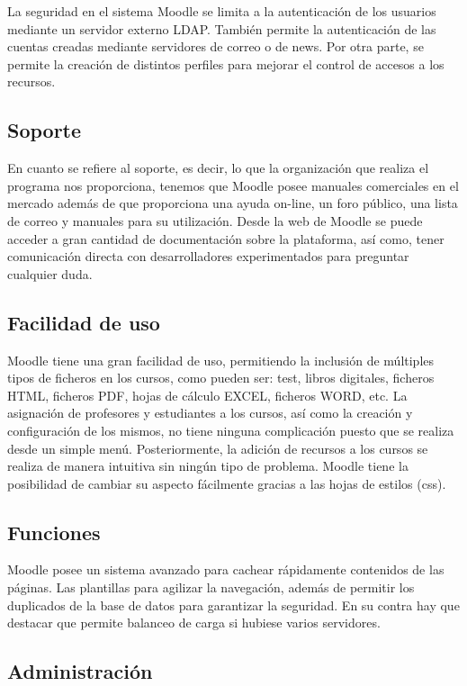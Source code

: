 La seguridad en el sistema Moodle se limita a la autenticación de los usuarios mediante un servidor externo LDAP. También permite la autenticación de las cuentas creadas mediante servidores de correo o de news. Por otra parte, se permite la creación de distintos perfiles para mejorar el control de accesos a los recursos.

\subsection{Soporte}

En cuanto se refiere al soporte, es decir, lo que la organización que realiza el programa nos proporciona, tenemos que Moodle posee manuales comerciales en el mercado además de que proporciona una ayuda on-line, un foro público, una lista de correo y manuales para su utilización. Desde la web de Moodle se puede acceder a gran cantidad de documentación sobre la plataforma, así como, tener comunicación directa con desarrolladores experimentados para preguntar cualquier duda.

\subsection{Facilidad de uso}

Moodle tiene una gran facilidad de uso, permitiendo la inclusión de múltiples tipos de ficheros en los cursos, como pueden ser: test, libros digitales, ficheros HTML, ficheros PDF, hojas de cálculo EXCEL, ficheros WORD, etc. La asignación de profesores y estudiantes a los cursos, así como la creación y configuración de los mismos, no tiene ninguna complicación puesto que se realiza desde un simple menú. Posteriormente, la adición de recursos a los cursos se realiza de manera intuitiva sin ningún tipo de problema. Moodle tiene la posibilidad de cambiar su aspecto fácilmente gracias a las hojas de estilos (css).

\subsection{Funciones}

Moodle posee un sistema avanzado para cachear rápidamente contenidos de las páginas. Las plantillas para agilizar la navegación, además de permitir los duplicados de la base de datos para garantizar la seguridad. En su contra hay que destacar que permite balanceo de carga si hubiese varios servidores.

\subsection{Administración}

